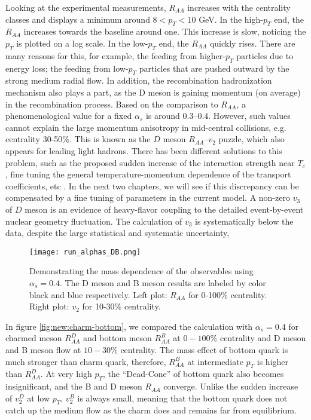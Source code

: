 Looking at the experimental measurements, $R_{AA}$ increases with the centrality classes and displays a minimum around $8 < p_T < 10$ GeV.
In the high-$p_T$ end, the $R_{AA}$ increases towards the baseline around one. 
This increase is slow, noticing the $p_T$ is plotted on a log scale.
In the low-$p_T$ end, the $R_{AA}$ quickly rises.
There are many reasons for this, for example, the feeding from higher-$p_T$ particles due to energy loss;  the feeding from low-$p_T$ particles that are pushed outward by the strong medium radial flow.
In addition, the recombination hadronization mechanism also plays a part, as the D meson is gaining momentum (on average) in the recombination process.
Based on the comparison to $R_{AA}$, a phenomenological value for a fixed $\alpha_s$ is around $0.3$--$0.4$.
However, such values cannot explain the large momentum anisotropy in mid-central collisions, e.g. centrality 30-50\%.
This is known as the $D$ meson $R_{AA}$--$v_2$ puzzle, which also appears for leading light hadrons.
There has been different solutions to this problem, such as the proposed sudden increase of the interaction strength near $T_c$, fine tuning the general temperature-momentum dependence of the transport coefficients, etc \cite{SCARDINA2016329,Xu:2017obm,Shi:2018vys}.
In the next two chapters, we will see if this discrepancy can be compensated by a fine tuning of parameters in the current model.
A non-zero $v_3$ of $D$ meson is an evidence of heavy-flavor coupling to the detailed event-by-event nuclear geometry fluctuation.
The calculation of $v_3$ is systematically below the data, despite the large statistical and systematic uncertainty,

\begin{figure}
\centering
\texttt{[image: run\_alphas\_DB.png]}
\caption{Demonstrating the mass dependence of the observables using $\alpha_s = 0.4$. 
The D meson and B meson results are labeled by color black and blue respectively.
Left plot: $R_{AA}$ for 0-100\% centrality. Right plot: $v_2$ for 10-30\% centrality.}
\label{fig:new:fix-DB}
\end{figure}

In figure \ref{fig:new:charm-bottom}, we compared the calculation with $\alpha_s = 0.4$ for charmed meson $R_{AA}^D$ and bottom meson $R_{AA}^B$ at $0-100\%$ centrality and D meson and B meson flow at $10-30\%$ centrality.
The mass effect of bottom quark is much stronger than charm quark, therefore, $R_{AA}^B$ at intermediate $p_T$ is higher than $R_{AA}^D$. 
At very high $p_T$, the ``Dead-Cone'' of bottom quark also becomes insignificant, and the B and D meson $R_{AA}$ converge.
Unlike the sudden increase of $v_2^D$ at low $p_T$, $v_2^B$ is always small, meaning that the bottom quark does not catch up the medium flow as the charm does and remains far from equilibrium.

